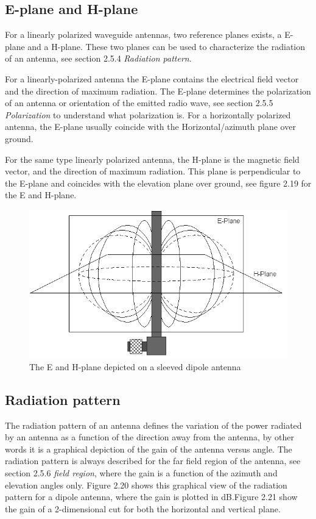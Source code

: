 \newpage

\subsection{E-plane and H-plane}
For a linearly polarized waveguide antennas, two reference planes exists, a E-plane and a H-plane. These two planes can be used to characterize the radiation of an antenna, see section 2.5.4 \textit{Radiation pattern}.

For a linearly-polarized antenna the E-plane contains the electrical field vector and the direction of maximum radiation. The E-plane determines the polarization of an antenna or orientation of the emitted radio wave, see section 2.5.5 \textit{Polarization} to understand what polarization is. For a horizontally polarized antenna, the E-plane usually coincide with the Horizontal/azimuth plane over ground. 

For the same type linearly polarized antenna, the H-plane is the magnetic field vector, and the direction of maximum radiation. This plane is perpendicular to the E-plane and coincides with the elevation plane over ground, see figure 2.19 for the E and H-plane. 

\begin{figure}[h]
\hspace{-0.5cm}
\includegraphics[scale=0.7]{figures/EH_Plane.png}
\caption{The E and H-plane depicted on a sleeved dipole antenna \cite{EH-plane}}
\end{figure}

\subsection{Radiation pattern}
The radiation pattern of an antenna defines the variation of the power radiated by an antenna as a function of the direction away from the antenna, by other words it is a graphical depiction of the gain of the antenna versus angle. The radiation pattern is always described for the far field region of the antenna, see section 2.5.6 \textit{field region}, where the gain is a function of the azimuth and elevation angles only. Figure 2.20 shows this graphical view of the radiation pattern for a dipole antenna, where the gain is plotted in dB.Figure 2.21 show the gain of a 2-dimensional cut for both the horizontal and vertical plane. 

